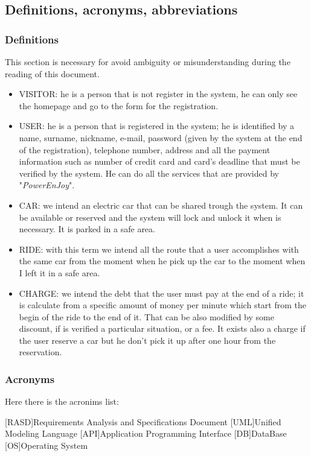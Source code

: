 \subsection{Definitions, acronyms, abbreviations} \label{subsec:def-ac-ab}

\subsubsection{Definitions} \label{def}
This section is necessary for avoid ambiguity or misunderstanding during the reading of this document. 
\begin{itemize}
\item VISITOR: he is a person that is not register in the system, he can only see the homepage and go to the form for the registration.
\item USER: he is a person that is registered in the system; he is identified by a name, surname, nickname, e-mail, password (given by the system at the end of the registration), telephone number, address and all the payment information such as number of credit card and card's deadline that must be verified by the system. He can do all the services that are provided by "\emph{PowerEnJoy}".
\item CAR: we intend an electric car that can be shared trough the system. It can be available or reserved and the system will lock and unlock it when is necessary. It is parked in a safe area.
\item RIDE: with this term we intend all the route that a user accomplishes with the same car from the moment when he pick up the car to the moment when I left it in a safe area.   
\item CHARGE: we intend the debt that the user must pay at the end of a ride; it is calculate from a specific amount of money per minute which start from the begin of the ride to the end of it. That can be also modified  by some discount, if is verified a particular situation, or a fee. It exists also a charge if the user reserve a car but he don't pick it up after one hour from the reservation.  

\end{itemize}

\subsubsection{Acronyms} \label{acr}
Here there is the acronims list:

\begin{acronym}[RASD] %

[RASD]{Requirements Analysis and Specifications Document}
[UML]{Unified Modeling Language}
[API]{Application Programming Interface}
[DB]{DataBase}
[OS]{Operating System}

\end{acronym}

